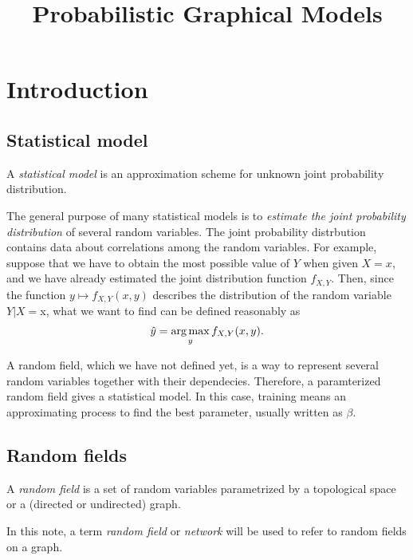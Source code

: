 \documentclass{../exp}
\title{Probabilistic Graphical Models}
\begin{document}
\maketitle
\tableofcontents




\section{Introduction}

\subsection{Statistical model}
\begin{defn}
A \emph{statistical model} is an approximation scheme for unknown joint probability distribution.
\end{defn}
The general purpose of many statistical models is to \emph{estimate the joint probability distribution} of several random variables.
The joint probability distrbution contains data about correlations among the random variables.
For example, suppose that we have to obtain the most possible value of $Y$ when given $X=x$, and we have already estimated the joint distribution function $f_{X,Y}$.
Then, since the function $y\mapsto f_{X,Y}(x,y)$ describes the distribution of the random variable $Y|X=$x, what we want to find can be defined reasonably as
\[\hat y=\operatorname*{arg\,max}_yf_{X,Y}(x,y).\]

\begin{ex}
A random field, which we have not defined yet, is a way to represent several random variables together with their dependecies.
Therefore, a paramterized random field gives a statistical model.
In this case, training means an approximating process to find the best parameter, usually written as $\beta$.
\end{ex}

\subsection{Random fields}
\begin{defn}
A \emph{random field} is a set of random variables parametrized by a topological space or a (directed or undirected) graph.
\end{defn}
\begin{defn}
In this note, a term \emph{random field} or \emph{network} will be used to refer to random fields on a graph.
\end{defn}
\end{document}
